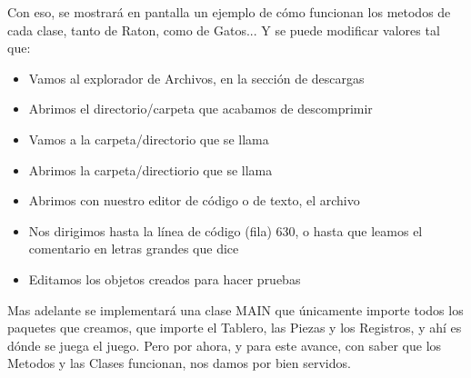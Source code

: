 \documentclass[12pt, Tahoma]{article}
\begin{document}
	
	Con eso, se mostrará en pantalla un ejemplo de cómo funcionan los metodos de cada clase, tanto de Raton, como de Gatos... Y se puede modificar valores tal que:
	\begin{itemize}
		\item Vamos al explorador de Archivos, en la sección de descargas
		\item Abrimos el directorio/carpeta que acabamos de descomprimir
		\item Vamos a la carpeta/directorio que se llama 
		\item Abrimos la carpeta/directiorio que se llama 
		\item Abrimos con nuestro editor de código o de texto, el archivo 
		\item Nos dirigimos hasta la línea de código (fila) 630, o hasta que leamos el comentario en letras grandes que dice 
		\item Editamos los objetos creados para hacer pruebas
	\end{itemize}
	
	
	Mas adelante se implementará una clase MAIN que únicamente importe todos los paquetes que creamos, que importe el Tablero, las Piezas y los Registros, y ahí es dónde se juega el juego. Pero por ahora, y para este avance, con saber que los Metodos y las Clases funcionan, nos damos por bien servidos.
	
\end{document}
